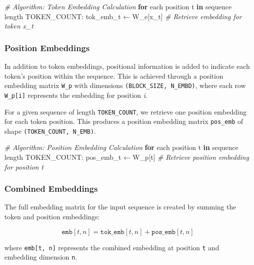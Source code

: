 \documentclass[11pt]{article}
\newenvironment{Shaded}{}{}
\newcommand{\KeywordTok}[1]{\textcolor[rgb]{0.00,0.44,0.13}{\textbf{{#1}}}}
\newcommand{\CommentTok}[1]{\textcolor[rgb]{0.38,0.63,0.69}{\textit{{#1}}}}
\newcommand{\NormalTok}[1]{{#1}}
\newcommand{\ControlFlowTok}[1]{\textcolor[rgb]{0.00,0.44,0.13}{\textbf{{#1}}}}
\begin{document}
\begin{Shaded}
\begin{Highlighting}[]
\CommentTok{\# Algorithm: Token Embedding Calculation}
\ControlFlowTok{for}\NormalTok{ each position t }\KeywordTok{in}\NormalTok{ sequence length TOKEN\_COUNT:}
\NormalTok{    tok\_emb\_t ← W\_e[x\_t]  }\CommentTok{\# Retrieve embedding for token x\_t}
\end{Highlighting}
\end{Shaded}

    \subsubsection{Position Embeddings}\label{position-embeddings}

In addition to token embeddings, positional information is added to
indicate each token's position within the sequence. This is achieved
through a position embedding matrix \texttt{W\_p} with dimensions
\texttt{(BLOCK\_SIZE,\ N\_EMBD)}, where each row \texttt{W\_p{[}i{]}}
represents the embedding for position \emph{i}.

For a given sequence of length \texttt{TOKEN\_COUNT}, we retrieve one
position embedding for each token position. This produces a position
embedding matrix \texttt{pos\_emb} of shape
\texttt{(TOKEN\_COUNT,\ N\_EMB)}.

\begin{Shaded}
\begin{Highlighting}[]
\CommentTok{\# Algorithm: Position Embedding Calculation}
\ControlFlowTok{for}\NormalTok{ each position t }\KeywordTok{in}\NormalTok{ sequence length TOKEN\_COUNT:}
\NormalTok{    pos\_emb\_t ← W\_p[t]  }\CommentTok{\# Retrieve position embedding for position t}
\end{Highlighting}
\end{Shaded}

    \subsubsection{Combined Embeddings}\label{combined-embeddings}

The full embedding matrix for the input sequence is created by summing
the token and position embeddings:

\[
\texttt{emb}[t, n] = \texttt{tok\_emb}[t, n] + \texttt{pos\_emb}[t, n]
\]

where \texttt{emb{[}t,\ n{]}} represents the combined embedding at
position \texttt{t} and embedding dimension \texttt{n}.
\end{document}
